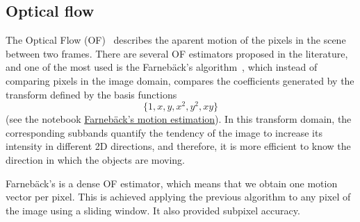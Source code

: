 
\subsection{Optical flow}

\begin{comment}
\begin{figure}
  \begin{tabular}{cccccc}
    \png{one}{200} & \png{x}{200} & \png{y}{200} & \png{x2}{200} & \png{y2}{200} & \png{xy}{200} \\
    No motion & Constant velocity in $X$ & Constant velocity in $Y$ & Constant acceleration in $X$ & Constant acceleration in $Y$ & Constant accelarion in diagonal
  \end{tabular}
  \caption{Correlation kernels (basis functions) used by the
    \emph{polynomial expansion} of the Farneb{\"a}ck's ME
    algorithm. See \href{https://github.com/Sistemas-Multimedia/Sistemas-Multimedia.github.io/blob/master/milestones/09-ME/farneback_ME.ipynb}{this}. The analized motion is depicted below the plot of each basis.}
  \label{fig:FarnebacK_basis}
\end{figure}
\end{comment}

The Optical Flow (OF)~\cite{horn1981determining} describes the aparent
motion of the pixels in the scene between two frames. There are
several OF estimators proposed in the literature, and one of the most
used is the Farneb{\"a}ck's algorithm~\cite{farneback2003two}, which
instead of comparing pixels in the image domain, compares the
coefficients generated by the transform defined by the basis functions
\begin{equation}
    \{1, x, y, x^2, y^2, xy\}
\end{equation}
(see the notebook
\href{https://github.com/vicente-gonzalez-ruiz/motion_estimation/blob/main/src/motion_estimation/farneback_ME.ipynb}{Farnebäck's
  motion estimation}). In this transform domain, the corresponding
subbands quantify the tendency of the image to increase its intensity
in different 2D directions, and therefore, it is more efficient to
know the direction in which the objects are moving.

Farneb{\"a}ck's is a dense OF estimator, which means that we obtain
one motion vector per pixel. This is achieved applying the previous
algorithm to any pixel of the image using a sliding window. It also
provided subpixel accuracy.

